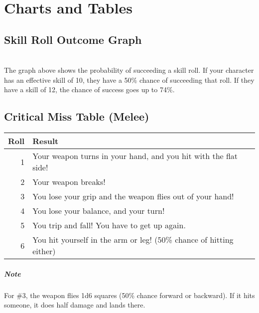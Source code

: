 \appendix
\chapter{Charts and Tables}
\section{Skill Roll Outcome Graph}
\\
The graph above shows the probability of succeeding a skill roll. If your character has an effective skill of 10, they have a 50\% chance of succeeding that roll. If they have a skill of 12, the chance of success goes up to 74\%.
\section{Critical Miss Table (Melee)}
\begin{center}
\begin{tabular}{r | l}
    \textbf{Roll} & \textbf{Result}\\\hline
    1 & Your weapon turns in your hand, and you hit with the flat side! \\
    2 & Your weapon breaks! \\
    3 & You lose your grip and the weapon flies out of your hand! \\
    4 & You lose your balance, and your turn! \\
    5 & You trip and fall! You have to get up again.\\
    6 & You hit yourself in the arm or leg! (50\% chance of hitting either)\\
\end{tabular}
\end{center}
\paragraph{Note}For \#3, the weapon flies 1d6 squares (50\% chance forward or backward). If it hits someone, it does half damage and lands there.

